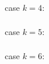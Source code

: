 \documentclass[a4paper,8pt]{article}
\begin{document}
\scriptsize
case $k=4$:
\begin{align*}
	
\end{align*}

case $k=5$:
\begin{align*}
	
\end{align*}

case $k=6$:
\begin{align*}
	
\end{align*}
\end{document}
